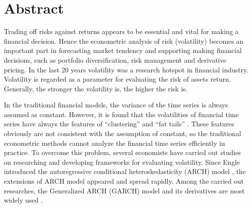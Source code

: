 \chapter*{\centering Abstract}\label{secAbstrct}

Trading off risks against returns appears to be essential and vital for making a financial decision. Hence the econometric analysis of risk (volatility) becomes an important part in forecasting market tendency and supporting making financial decisions, such as portfolio diversification, risk management and derivative pricing. In the last 20 years volatility was a research hotspot in financial industry. Volatility is regarded as a parameter for evaluating the risk of assets return. Generally, the stronger the volatility is, the higher the risk is.

In the traditional financial models, the variance of the time series is always assumed as constant. However, it is found that the volatilities of financial time series have always the features of ``clustering'' and ``fat tails''  \citep{Mandelbrot1963,EugeneF.Fama1965}. These features obviously are not consistent with the assumption of constant, so the traditional econometric methods cannot analyze the financial time series efficiently in practice. To overcome this problem, several economists have carried out studies on researching and developing frameworks for evaluating volatility. Since Engle introduced the autoregressive conditional heteroskedasticity (ARCH) model \citep{Engle1982}, the extensions of ARCH model appeared and spread rapidly. Among the carried out researches, the Generalized ARCH (GARCH) model and its derivatives are most widely used \citep{Bollerslev1986}.

